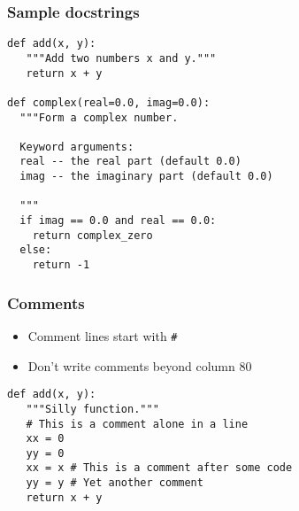 \documentclass[11pt]{beamer}
\begin{document}
\begin{frame}[fragile]\frametitle{Sample docstrings}
\label{sec-3_3}


\begin{lstlisting}
def add(x, y):
   """Add two numbers x and y."""
   return x + y

def complex(real=0.0, imag=0.0):
  """Form a complex number.

  Keyword arguments:
  real -- the real part (default 0.0)
  imag -- the imaginary part (default 0.0)

  """
  if imag == 0.0 and real == 0.0: 
    return complex_zero
  else:
    return -1
\end{lstlisting}
\end{frame}
\begin{frame}[fragile]\frametitle{Comments}
\label{sec-3_4}


\begin{itemize}
\item Comment lines start with \texttt{\#}
\item Don't write comments beyond column 80
\end{itemize}

\begin{lstlisting}
def add(x, y):
   """Silly function."""
   # This is a comment alone in a line
   xx = 0
   yy = 0
   xx = x # This is a comment after some code
   yy = y # Yet another comment
   return x + y
\end{lstlisting}
\end{frame}
\end{document}
